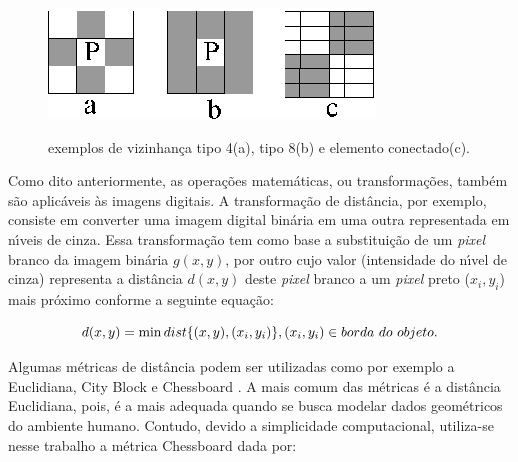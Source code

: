 \begin{figure}[hbt]
\begin{center}
\includegraphics[scale=1.0]{eps/conectado1.eps}\\
\end{center}
\caption{\label{conectado}\hspace{-0.1em} exemplos de vizinhan\c{c}a tipo 4(a), tipo 8(b) e elemento conectado(c).}
\end{figure}

Como dito anteriormente, as opera\c{c}\~{o}es matem\'{a}ticas, ou transforma\c{c}\~{o}es, tamb\'{e}m s\~{a}o aplic\'{a}veis \`{a}s imagens digitais. A transforma\c{c}\~{a}o de dist\^{a}ncia, por exemplo, consiste em converter uma imagem digital bin\'{a}ria em uma outra representada em n\'{\i}veis de cinza.  Essa transforma\c{c}\~{a}o tem como base a substitui\c{c}\~{a}o de um \emph{pixel} branco da imagem bin\'{a}ria $g(x,y)$, por outro cujo valor (intensidade do n\'{\i}vel de cinza) representa a dist\^{a}ncia $d(x,y)$ deste \textit{pixel} branco a um \textit{pixel} preto ($x_i,y_i$) mais pr\'{o}ximo conforme a seguinte equa\c{c}\~{a}o:

\begin{equation}
\label{eqDist}
 d(x,y) = \min dist\{ (x,y),(x_i ,y_i )\}, \\
 (x_i ,y_i ) \in borda\ do\ objeto. \\
\end{equation}

Algumas m\'{e}tricas de dist\^{a}ncia podem ser utilizadas como por exemplo a Euclidiana, City Block e Chessboard \cite{Ricardo}. A mais comum das m\'{e}tricas \'{e} a dist\^{a}ncia Euclidiana, pois, \'{e} a mais adequada quando se busca modelar dados geom\'{e}tricos do ambiente humano. Contudo, devido a simplicidade computacional, utiliza-se nesse trabalho a m\'{e}trica Chessboard dada por:




